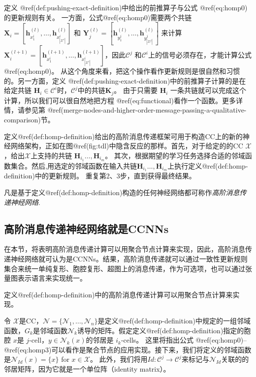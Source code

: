 \documentclass[
  12pt,
]{krantz}
\begin{document}
定义 @ref(def:pushing-exact-definition)中给出的前推算子与公式
@ref(eq:homp0)的更新规则有关。
一方面，公式@ref(eq:homp0)需要两个共链\(\mathbf{X}_i= [\mathbf{h}_{x^i_1}^{(l)},\ldots,\mathbf{h}_{x^i_{|\mathcal{X}^i|}}^{(l)}]\)
和
\(\mathbf{Y}_{j}^{(l)}=[\mathbf{h}_{y^{j}_1}^{(l)},\ldots,\mathbf{h}_{y^{j}_{|\mathcal{X}^{j}|}}^{(l)}]\)
来计算
\(\mathbf{X}^{(l+1)}_i = [\mathbf{h}_{x^i_1}^{(l+1)},\ldots,\mathbf{h}_{x^i_{|\mathcal{X}^i|}}^{(l+1)}]\)，因此\(\mathcal{C}^j\)
和\(\mathcal{C}^i\)上的信号必须存在，才能计算公式@ref(eq:homp0)。
从这个角度来看，把这个操作看作更新规则是很自然和习惯的。另一方面，定义
@ref(def:pushing-exact-definition)中的前推算子计算的是在给定共链
\(\mathbf{H}_i\in \mathcal{C}^i\)时，\(\mathcal{C}^j\)中的共链\(\mathbf{K}_{j}\)。
由于只需要 \(\mathbf{H}_i\)
一条共链就可以完成这个计算，所以我们可以很自然地把方程
@ref(eq:functional)看作一个函数。更多详情，请参见第
@ref(merge-nodes-and-higher-order-message-passing-a-qualitative-comparison)节。

定义@ref(def:homp-definition)给出的高阶消息传递框架可用于构造CC上的新的神经网络架构，正如在图@ref(fig:tdl)中隐含反应的那样。首先，对于给定的的CC
\(\mathcal{X}\)，给出\(\mathcal{X}\)上支持的共链
\(\mathbf{H}_{i_1}\ldots, \mathbf{H}_{i_m}\)。
其次，根据期望的学习任务选择合适的邻域函数集合。然后,用选定的邻域函数在输入共链\(\mathbf{H}_{i_1}\ldots, \mathbf{H}_{i_m}\)上执行定义@ref(def:homp-definition)中的更新规则。
重复第2、3步，直到获得最终结果。

\label{hmpsnn}
凡是基于定义@ref(def:homp-definition)构造的任何神经网络都可称作\emph{高阶消息传递神经网络}.

\subsection{高阶消息传递神经网络就是CCNNs}\label{higher-order-message-passing-neural-networks-are-ccnns}

在本节，将表明高阶消息传递计算可以用聚合节点计算来实现，因此，高阶消息传递神经网络就可认为是CCNNs。结果，高阶消息传递就可以通过一致性更新规则集合来统一单纯复形、胞腔复形、超图上的消息传递，作为可选项，也可以通过张量图表示语言来实现统一。

\label{mn}
定义@ref(def:homp-definition)中的高阶消息传递计算可以用聚合节点计算来实现。

令
\(\mathcal{X}\)是CC，\(\mathcal{N}=\{ \mathcal{N}_1,\ldots,\mathcal{N}_n\}\)是定义@ref(def:homp-definition)中规定的一组邻域函数，\(G_k\)是邻域函数\(\mathcal{N}_k\)诱导的矩阵。假定定义@ref(def:homp-definition)指定的胞腔
\(x\)是 \(j\)-cell，\(y \in \mathcal{N}_k(x)\)的邻居是 \(i_k\)-cells。
这里将指出公式
@ref(eq:homp0)--@ref(eq:homp3)可以看作是聚合节点的应用实现。接下来，我们将定义的邻域函数是\(\mathcal{N}_{Id}(x)=\{x\}\)
for \(x\in \mathcal{X}\)。
此外，我们将用\(Id\colon\mathcal{C}^j\to \mathcal{C}^j\)来标记与\(\mathcal{N}_{Id}\)关联的的邻居矩阵，因为它就是一个单位阵（identity
matrix）。
\end{document}
